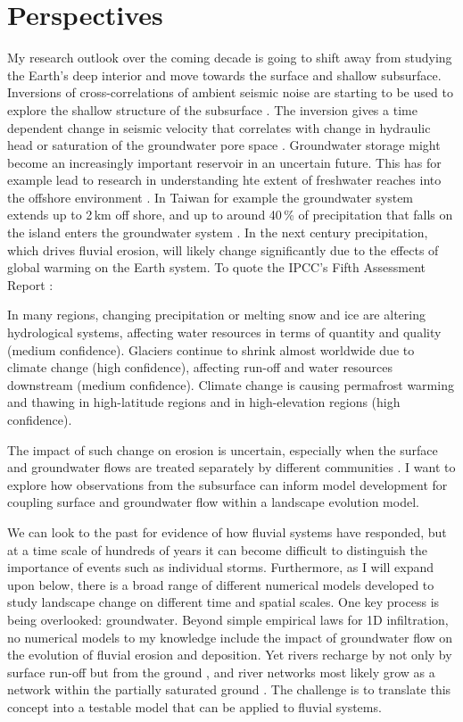 \chapter{Perspectives}

My research outlook over the coming decade is going to shift away from studying the Earth's deep interior and move towards the surface and shallow subsurface. Inversions of cross-correlations of ambient seismic noise are starting to be used to explore the shallow structure of the subsurface \citep[e.g.][]{clements-2018}. The inversion gives a time dependent change in seismic velocity that correlates with change in hydraulic head or saturation of the groundwater pore space \citep{lecocq-etal-2017}. Groundwater storage might become an increasingly important reservoir in an uncertain future. This has for example lead to research in understanding hte extent of freshwater reaches into the offshore environment \citep[e.g.][]{micallef-etal-2020}. In Taiwan for example the groundwater system extends up to 2\,km off shore, and up to around 40\,\% of precipitation that falls on the island enters the groundwater system \citep{calmels-etal-2011}. In the next century precipitation, which drives fluvial erosion, will likely change significantly due to the effects of global warming on the Earth system. To quote the IPCC's Fifth Assessment Report \cite{IPCC-policy-2014}:
\begin{displayquote}
In many regions, changing precipitation or melting snow and ice are altering hydrological systems, affecting water resources in terms of quantity and quality (medium confidence). Glaciers continue to shrink almost worldwide due to climate change (high confidence), affecting run-off and water resources downstream (medium confidence). Climate change is causing permafrost warming and thawing in high-latitude regions and in high-elevation regions (high confidence).
\end{displayquote}
The impact of such change on erosion is uncertain, especially when the surface and groundwater flows are treated separately by different communities \citep{berkowitz-2020}. I want to explore how observations from the subsurface can inform model development for coupling surface and groundwater flow within a landscape evolution model.

We can look to the past for evidence of how fluvial systems have responded, but at a time scale of hundreds of years it can become difficult to distinguish the importance of events such as individual storms. Furthermore, as I will expand upon below, there is a broad range of different numerical models developed to study landscape change on different time and spatial scales. One key process is being overlooked: groundwater. Beyond simple empirical laws for 1D infiltration, no numerical models to my knowledge include the impact of groundwater flow on the evolution of fluvial erosion and deposition. Yet rivers recharge by not only by surface run-off but from the ground \citep[e.g.][]{condon-etal-2020}, and river networks most likely grow as a network within the partially saturated ground \citep[e.g.][]{fan-etal-2019}. The challenge is to translate this concept into a testable model that can be applied to fluvial systems.


